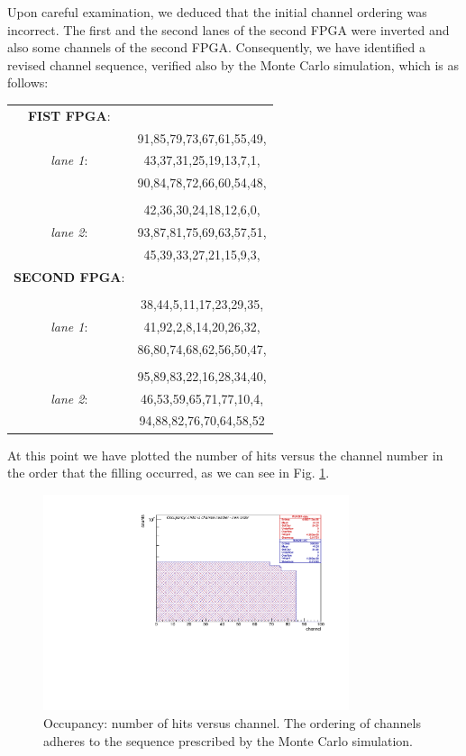 Upon careful examination, we deduced that the initial channel ordering was incorrect. 
The first and the second lanes of the second FPGA were inverted and also some channels of the second FPGA.
Consequently, we have identified a revised channel sequence, verified also by the Monte Carlo simulation, which is as follows:
\begin{center}
\begin{tabular}{cc}
\textbf{FIST FPGA}: & \\
&91,85,79,73,67,61,55,49,\\
\textit{lane 1}: &43,37,31,25,19,13,7,1,\\
&90,84,78,72,66,60,54,48,\\
& \\
&42,36,30,24,18,12,6,0,\\
\textit{lane 2}: &93,87,81,75,69,63,57,51,\\
&45,39,33,27,21,15,9,3,\\
\textbf{SECOND FPGA}:&\\
&\\
&38,44,5,11,17,23,29,35,\\
\textit{lane 1}:&41,92,2,8,14,20,26,32,\\
&86,80,74,68,62,56,50,47,\\
 & \\
&95,89,83,22,16,28,34,40,\\
\textit{lane 2}:&46,53,59,65,71,77,10,4,\\
&94,88,82,76,70,64,58,52\\
\end{tabular}
\end{center}   
At this point we have plotted the number of hits versus the channel number in the order that the filling occurred, as we can see in Fig. \ref{fig:2}.
\begin{figure}[!h]
\centering
\includegraphics[width =0.8\textwidth]{figures/pdf/figure_00004_nhitsvschannel_roc_simulation_2}
\caption{Occupancy: number of hits versus channel. The ordering of channels adheres to the sequence prescribed by the Monte Carlo simulation.}
\label{fig:2}
\end{figure}
